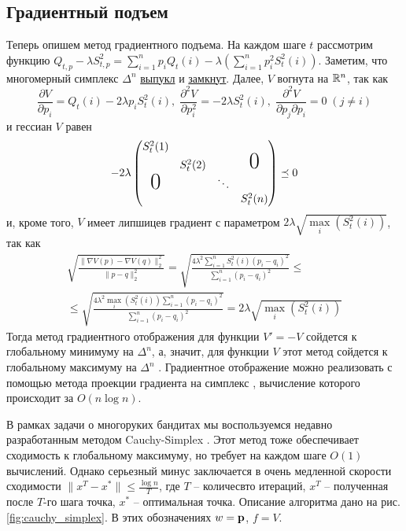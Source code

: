 \subsection{Градиентный подъем}
Теперь опишем метод градиентного подъема. На каждом шаге $t$ рассмотрим функцию $Q_{t,p} - \lambda S_{t,p}^2 = \sum_{i=1}^n p_i Q_t(i) - \lambda \left( \sum_{i=1}^n p_i^2 S_t^2(i)\right)$. Заметим, что многомерный симплекс $\Delta^n$ \href{https://en.wikipedia.org/wiki/Simplex#}{выпукл} и  \href{https://en.wikipedia.org/wiki/Simplex#Increasing_coordinates}{замкнут}. Далее, $V$ вогнута на $\mathbb{R}^n$, так как
 \[
 \frac{\partial V}{\partial p_i} = Q_t(i) - 2\lambda p_i S_t^2(i), \;
 \frac{\partial^2 V}{\partial p_i^2} = -2\lambda S_t^2(i), \;
 \frac{\partial^2 V}{\partial p_j \partial p_i} = 0 \; (j \neq i)
 \]
и гессиан $V$ равен
\[
-2\lambda
\begin{pmatrix}
    S_t^2(1)        &          &        &                  \\
                    & S_t^2(2) &        & \text{\huge{0}}  \\
    \text{\huge{0}} &          & \ddots &                  \\
                    &          &        & S_t^2(n)
\end{pmatrix}
\preceq 0
\]
и, кроме того, $V$ имеет липшицев градиент с параметром $2\lambda \sqrt{\underset{i}{\max}(S_t^2(i))}$, так как 
\begin{multline}
    \sqrt{\frac{\| \nabla V (p) - \nabla V (q) \|_2^2}{\| p - q \|_2^2}} = \sqrt{\frac{4\lambda^2 \sum_{i=1}^n S_t^2(i) (p_i - q_i)^2}{\sum_{i=1}^n (p_i - q_i)^2}} \leq \\ \leq \sqrt{\frac{4\lambda^2 \underset{i}{\max}(S_t^2(i)) \sum_{i=1}^n (p_i - q_i)^2}{\sum_{i=1}^n (p_i - q_i)^2}} = 2\lambda \sqrt{\underset{i}{\max}(S_t^2(i))}
\end{multline}
Тогда метод градиентного отображения для функции $V' = -V$ сойдется к глобальному минимуму на $\Delta^n$, а, значит, для функции $V$ этот метод сойдется к глобальному максимуму на $\Delta^n$ \cite{nesterov_convergence}. Градиентное отображение можно реализовать с помощью метода проекции градиента на симплекс \cite{simplex_projection}, вычисление которого происходит за $O(n \log n)$.

В рамках задачи о многоруких бандитах мы воспользуемся недавно разработанным методом Cauchy-Simplex \cite{cauchy_simplex}. Этот метод тоже обеспечивает сходимость к глобальному максимуму, но требует на каждом шаге $O(1)$ вычислений. Однако серьезный минус заключается в очень медленной скорости сходимости $\| x^T - x^*\| \leq \frac{\log n}{T}$, где $T$ -- количесвто итераций, $x^T$ -- полученная после $T$-го шага точка, $x^*$ -- оптимальная точка. Описание алгоритма дано на рис. \ref{fig:cauchy_simplex}. В этих обозначениях $w = \textbf{p}$, $f = V$.


